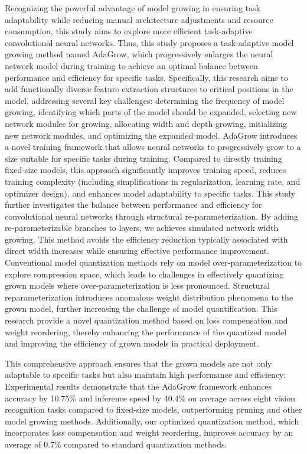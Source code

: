 \documentclass[preprint,12pt]{elsarticle}
\begin{document}
Recognizing the powerful advantage of model growing in ensuring task adaptability while reducing manual architecture adjustments and resource consumption, this study aims to explore more efficient task-adaptive convolutional neural networks. Thus, this study proposes a task-adaptive model growing method named AdaGrow, which progressively enlarges the neural network model during training to achieve an optimal balance between performance and efficiency for specific tasks. Specifically, this research aims to add functionally diverse feature extraction structures to critical positions in the model, addressing several key challenges: determining the frequency of model growing, identifying which parts of the model should be expanded, selecting new network modules for growing, allocating width and depth growing, initializing new network modules, and optimizing the expanded model. AdaGrow introduces a novel training framework that allows neural networks to progressively grow to a size suitable for specific tasks during training. Compared to directly training fixed-size models, this approach significantly improves training speed, reduces training complexity (including simplifications in regularization, learning rate, and optimizer design), and enhances model adaptability to specific tasks. This study further investigates the balance between performance and efficiency for convolutional neural networks through structural re-parameterization. By adding re-parameterizable branches to layers, we achieves simulated network width growing. This method avoids the efficiency reduction typically associated with direct width increases while ensuring effective performance improvement. Conventional model quantization methods rely on model over-parameterization to explore compression space, which leads to challenges in effectively quantizing grown models where over-parameterization is less pronounced. Structural reparameterization introduces anomalous weight distribution phenomena to the grown model, further increasing the challenge of model quantification. This research provide a novel quantization method based on loss compensation and weight reordering, thereby enhancing the performance of the quantized model and improving the efficiency of grown models in practical deployment. 

This comprehensive approach ensures that the grown models are not only adaptable to specific tasks but also maintain high performance and efficiency: Experimental results demonstrate that the AdaGrow framework enhances accuracy by 10.75\% and inference speed by 40.4\% on average across eight vision recognition tasks compared to fixed-size models, outperforming pruning and other model growing methods. Additionally, our optimized quantization method, which incorporates loss compensation and weight reordering, improves accuracy by an average of 0.7\% compared to standard quantization methods.
\end{document}
